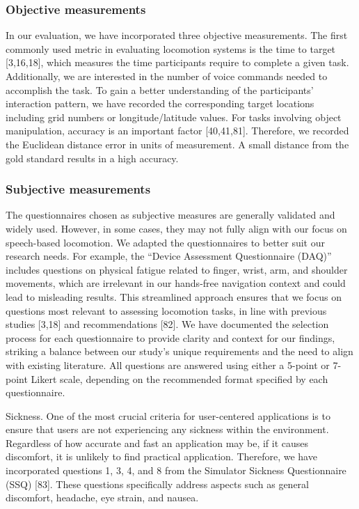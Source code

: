 \documentclass[preprint,12pt]{elsarticle}
\newcommand{\reftext}[1]{{\color{gray}#1}}   %
\begin{document}
\subsubsection{Objective measurements}
\reftext{In our evaluation, we have incorporated three objective measurements. The first commonly used metric in evaluating locomotion systems is the time to target [3,16,18], which measures the time participants require to complete a given task. Additionally, we are interested in the number of voice commands needed to accomplish the task. To gain a better understanding of the participants' interaction pattern, we have recorded the corresponding target locations including grid numbers or longitude/latitude values. For tasks involving object manipulation, accuracy is an important factor [40,41,81]. Therefore, we recorded the Euclidean distance error in units of measurement. A small distance from the gold standard results in a high accuracy.}

\subsubsection{Subjective measurements}
\reftext{The questionnaires chosen as subjective measures are generally validated and widely used. However, in some cases, they may not fully align with our focus on speech-based locomotion. We adapted the questionnaires to better suit our research needs. For example, the ``Device Assessment Questionnaire (DAQ)'' includes questions on physical fatigue related to finger, wrist, arm, and shoulder movements, which are irrelevant in our hands-free navigation context and could lead to misleading results. This streamlined approach ensures that we focus on questions most relevant to assessing locomotion tasks, in line with previous studies [3,18] and recommendations [82]. We have documented the selection process for each questionnaire to provide clarity and context for our findings, striking a balance between our study's unique requirements and the need to align with existing literature. All questions are answered using either a 5-point or 7-point Likert scale, depending on the recommended format specified by each questionnaire.}

\reftext{Sickness. One of the most crucial criteria for user-centered applications is to ensure that users are not experiencing any sickness within the environment. Regardless of how accurate and fast an application may be, if it causes discomfort, it is unlikely to find practical application. Therefore, we have incorporated questions 1, 3, 4, and 8 from the Simulator Sickness Questionnaire (SSQ) [83]. These questions specifically address aspects such as general discomfort, headache, eye strain, and nausea.}
\end{document}
